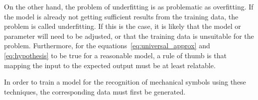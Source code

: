 On the other hand, the problem of underfitting is as problematic as overfitting.
If the model is already not getting sufficient results from the training data, the problem is called underfitting.
If this is the case, it is likely that the model or parameter will need to be adjusted, or that the training data is unsuitable for the problem.
Furthermore, for the equations~\eqref{eq:universal_approx} and \eqref{eq:hypothesis} to be true for a reasonable model, a rule of thumb is that mapping the input to the expected output must be at least relatable.

In order to train a model for the recognition of mechanical symbols using these techniques, the corresponding data must first be generated.

